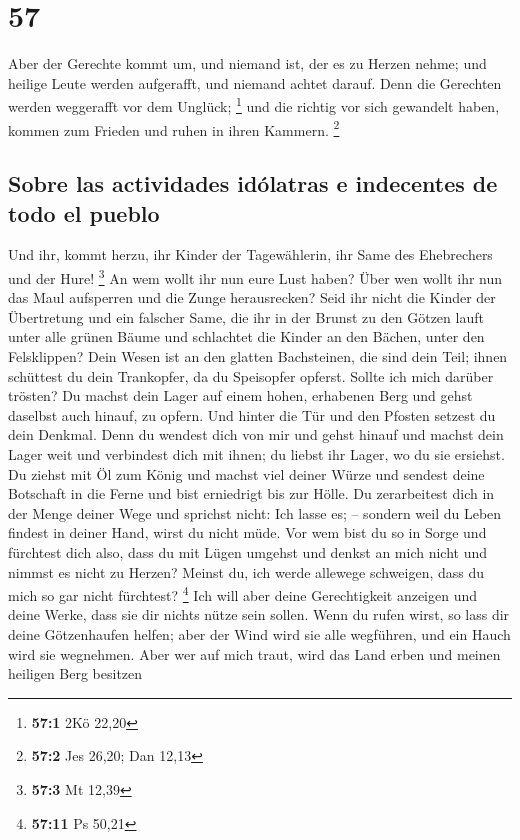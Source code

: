 \hypertarget{section-56}{%
\section{57}\label{section-56}}

 Aber der Gerechte kommt um, und niemand ist, der es zu
Herzen nehme; und heilige Leute werden aufgerafft, und niemand achtet
darauf. Denn die Gerechten werden weggerafft vor dem Unglück;
\footnote{\textbf{57:1} 2Kö 22,20}  und die richtig vor
sich gewandelt haben, kommen zum Frieden und ruhen in ihren Kammern.
\footnote{\textbf{57:2} Jes 26,20; Dan 12,13}

\hypertarget{sobre-las-actividades-iduxf3latras-e-indecentes-de-todo-el-pueblo}{%
\subsection{Sobre las actividades idólatras e indecentes de todo el
pueblo}\label{sobre-las-actividades-iduxf3latras-e-indecentes-de-todo-el-pueblo}}

 Und ihr, kommt herzu, ihr Kinder der Tagewählerin, ihr
Same des Ehebrechers und der Hure! \footnote{\textbf{57:3} Mt 12,39}
 An wem wollt ihr nun eure Lust haben? Über wen wollt ihr
nun das Maul aufsperren und die Zunge herausrecken? Seid ihr nicht die
Kinder der Übertretung und ein falscher Same,  die ihr in
der Brunst zu den Götzen lauft unter alle grünen Bäume und schlachtet
die Kinder an den Bächen, unter den Felsklippen?  Dein
Wesen ist an den glatten Bachsteinen, die sind dein Teil; ihnen
schüttest du dein Trankopfer, da du Speisopfer opferst. Sollte ich mich
darüber trösten?  Du machst dein Lager auf einem hohen,
erhabenen Berg und gehst daselbst auch hinauf, zu opfern. 
Und hinter die Tür und den Pfosten setzest du dein Denkmal. Denn du
wendest dich von mir und gehst hinauf und machst dein Lager weit und
verbindest dich mit ihnen; du liebst ihr Lager, wo du sie ersiehst.
 Du ziehst mit Öl zum König und machst viel deiner Würze
und sendest deine Botschaft in die Ferne und bist erniedrigt bis zur
Hölle.  Du zerarbeitest dich in der Menge deiner Wege und
sprichst nicht: Ich lasse es; -- sondern weil du Leben findest in deiner
Hand, wirst du nicht müde.  Vor wem bist du so in Sorge
und fürchtest dich also, dass du mit Lügen umgehst und denkst an mich
nicht und nimmst es nicht zu Herzen? Meinst du, ich werde allewege
schweigen, dass du mich so gar nicht fürchtest? \footnote{\textbf{57:11}
  Ps 50,21}  Ich will aber deine Gerechtigkeit anzeigen
und deine Werke, dass sie dir nichts nütze sein sollen. 
Wenn du rufen wirst, so lass dir deine Götzenhaufen helfen; aber der
Wind wird sie alle wegführen, und ein Hauch wird sie wegnehmen. Aber wer
auf mich traut, wird das Land erben und meinen heiligen Berg besitzen


